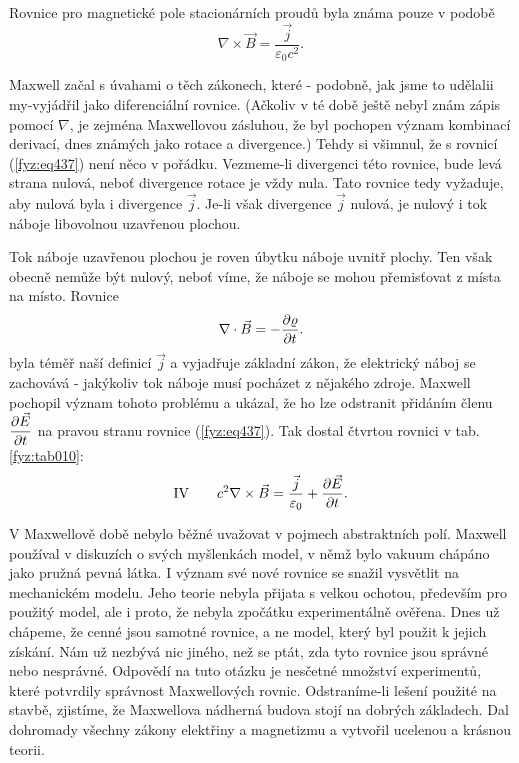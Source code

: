 {  Rovnice pro magnetické pole stacionárních proudů byla známa pouze v podobě
  \begin{equation}\label{fyz:eq437}
    \nabla\times\vec{B} = \dfrac{\vec{j}}{\varepsilon_0c^2}.
  \end{equation}
  
  Maxwell začal s úvahami o těch zákonech, které - podobně, jak jsme to udělalii my-vyjádřil jako 
  diferenciální rovnice. (Ačkoliv v té době ještě nebyl znám zápis pomocí \(\nabla\), je zejména 
  Maxwellovou zásluhou, že byl pochopen význam kombinací derivací, dnes známých jako rotace a 
  divergence.) Tehdy si všimnul, že s rovnicí (\ref{fyz:eq437}) není něco v pořádku. Vezmeme-li 
  divergenci této rovnice, bude levá strana nulová, neboť divergence rotace je vždy nula. Tato 
  rovnice tedy vyžaduje, aby nulová byla i divergence \(\vec{j}\). Je-li však divergence 
  \(\vec{j}\) nulová, je nulový i tok náboje libovolnou uzavřenou plochou. 
  
  Tok náboje uzavřenou plochou je roven úbytku náboje uvnitř plochy. Ten však obecně nemůže být 
  nulový, neboť víme, že náboje se mohou přemisťovat z místa na místo. Rovnice
  \begin{equation}\label{fyz:eq438}
    \nabla\cdot\vec{B} = -\dfrac{\partial \varrho}{\partial t}.
  \end{equation}
  byla téměř naší definicí \(\vec{j}\) a vyjadřuje základní zákon, že elektrický náboj se zachovává 
  - jakýkoliv tok náboje musí pocházet z nějakého zdroje. Maxwell pochopil význam tohoto problému a 
  ukázal, že ho lze odstranit přidáním členu \(\dfrac{\partial \vec{E}}{\partial t}\) na pravou stranu rovnice 
  (\ref{fyz:eq437}). Tak dostal čtvrtou rovnici v tab. \ref{fyz:tab010}:
  \begin{equation}\label{fyz:eq439}
    \text{IV}\qquad c^2\nabla\times\vec{B} = \frac{\vec{j}}{\varepsilon_0} + \dfrac{\partial \vec{E}}{\partial t}.
  \end{equation}
  
  V Maxwellově době nebylo běžné uvažovat v pojmech abstraktních polí. Maxwell používal v diskuzích 
  o svých myšlenkách model, v němž bylo vakuum chápáno jako pružná pevná látka. I význam své nové 
  rovnice se snažil vysvětlit na mechanickém modelu. Jeho teorie nebyla přijata s velkou ochotou, 
  především pro použitý model, ale i proto, že nebyla zpočátku experimentálně ověřena. Dnes už 
  chápeme, že cenné jsou samotné rovnice, a ne model, který byl použit k jejich získání. Nám už 
  nezbývá nic jiného, než se ptát, zda tyto rovnice jsou správné nebo nesprávné. Odpovědí na tuto 
  otázku je nesčetné množství experimentů, které potvrdily správnost Maxwellových rovnic. 
  Odstraníme-li lešení použité na stavbě, zjistíme, že Maxwellova nádherná budova stojí na dobrých 
  základech. Dal dohromady všechny zákony elektřiny a magnetizmu a vytvořil ucelenou a krásnou 
  teorii.
  
}
